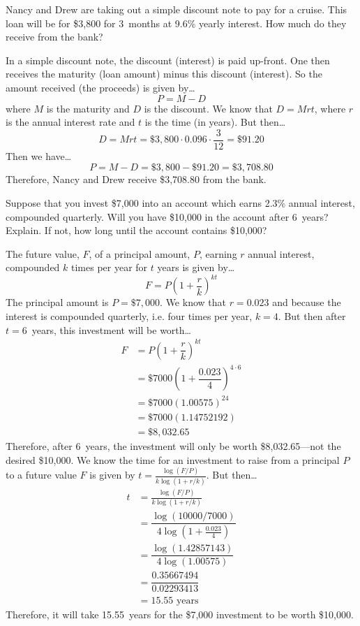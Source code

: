 \documentclass[12pt,letterpaper]{exam}
\begin{document}
\begin{questions}
\newpage
\question[10] Nancy and Drew are taking out a simple discount note to pay for a cruise. This loan will be for \$3,800 for 3~months at 9.6\% yearly interest. How much do they receive from the bank? \pspace

\sol In a simple discount note, the discount (interest) is paid up-front. One then receives the maturity (loan amount) minus this discount (interest). So the amount received (the proceeds) is given by\dots
	\[
	P= M - D
	\]
where $M$ is the maturity and $D$ is the discount. We know that $D= Mrt$, where $r$ is the annual interest rate and $t$ is the time (in years). But then\dots
	\[
	D= Mrt= \$3,\!800 \cdot 0.096 \cdot \frac{3}{12}= \$91.20
	\]
Then we have\dots
	\[
	P= M - D= \$3,\!800 - \$91.20= \$3,\!708.80
	\] \pspace
Therefore, Nancy and Drew receive \$3,708.80 from the bank. 



\newpage
\question[10] Suppose that you invest \$7,000 into an account which earns 2.3\% annual interest, compounded quarterly. Will you have \$10,000 in the account after 6~years? Explain. If not, how long until the account contains \$10,000? \pspace

\sol The future value, $F$, of a principal amount, $P$, earning $r$ annual interest, compounded $k$ times per year for $t$ years is given by\dots
	\[
	F= P \left(1 + \dfrac{r}{k} \right)^{kt}
	\]
The principal amount is $P= \$7,\!000$. We know that $r= 0.023$ and because the interest is compounded quarterly, i.e. four times per year, $k= 4$. But then after $t= 6$~years, this investment will be worth\dots
	\[
	\begin{aligned}
	F&= P \left(1 + \dfrac{r}{k} \right)^{kt} \\[0.3cm]
	&= \$7000 \left(1 + \dfrac{0.023}{4} \right)^{4 \cdot 6} \\[0.3cm]
	&= \$7000 (1.00575)^{24} \\[0.3cm]
	&= \$7000(1.14752192) \\[0.3cm]
	&= \$8,\!032.65
	\end{aligned}
	\]
Therefore, after 6~years, the investment will only be worth \$8,032.65---not the desired \$10,000. We know the time for an investment to raise from a principal $P$ to a future value $F$ is given by $t= \frac{\log(F/P)}{k \log(1 + r/k)}$. But then\dots
	\[
	\begin{aligned}
	t&= \frac{\log(F/P)}{k \log(1 + r/k)} \\[0.3cm]
	&= \dfrac{\log(10000/7000)}{4 \log \left(1 + \frac{0.023}{4} \right)} \\[0.3cm]
	&= \dfrac{\log(1.42857143)}{4 \log(1.00575)} \\[0.3cm]
	&= \dfrac{0.35667494}{0.02293413} \\[0.3cm]
	&= 15.55 \text{ years}
	\end{aligned}
	\]
Therefore, it will take 15.55~years for the \$7,000 investment to be worth \$10,000. 


\end{questions}
\end{document}
